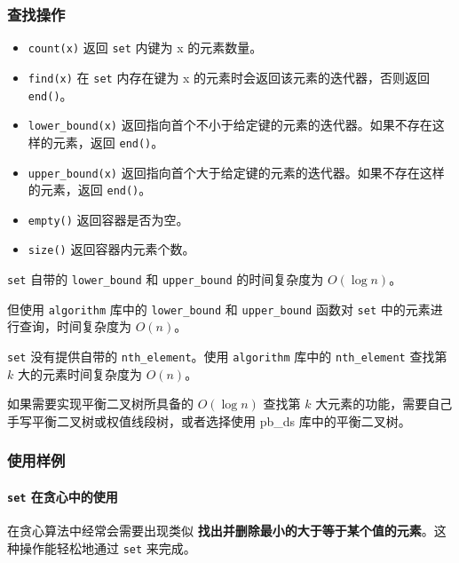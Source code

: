 \subsubsection{查找操作}\label{ux67e5ux627eux64cdux4f5c}

\begin{itemize}
\tightlist
\item
  \texttt{count(x)} 返回 \texttt{set} 内键为 x 的元素数量。
\item
  \texttt{find(x)} 在 \texttt{set} 内存在键为 x 的元素时会返回该元素的迭代器，否则返回 \texttt{end()}。
\item
  \texttt{lower\_bound(x)} 返回指向首个不小于给定键的元素的迭代器。如果不存在这样的元素，返回 \texttt{end()}。
\item
  \texttt{upper\_bound(x)} 返回指向首个大于给定键的元素的迭代器。如果不存在这样的元素，返回 \texttt{end()}。
\item
  \texttt{empty()} 返回容器是否为空。
\item
  \texttt{size()} 返回容器内元素个数。
\end{itemize}

\texttt{set} 自带的 \texttt{lower\_bound} 和 \texttt{upper\_bound} 的时间复杂度为 \(O(\log n)\)。

但使用 \texttt{algorithm} 库中的 \texttt{lower\_bound} 和 \texttt{upper\_bound} 函数对 \texttt{set} 中的元素进行查询，时间复杂度为 \(O(n)\)。

\texttt{set} 没有提供自带的 \texttt{nth\_element}。使用 \texttt{algorithm} 库中的 \texttt{nth\_element} 查找第 \(k\) 大的元素时间复杂度为 \(O(n)\)。

如果需要实现平衡二叉树所具备的 \(O(\log n)\) 查找第 \(k\) 大元素的功能，需要自己手写平衡二叉树或权值线段树，或者选择使用 pb\_ds 库中的平衡二叉树。

\subsubsection{使用样例}\label{ux4f7fux7528ux6837ux4f8b}

\paragraph{\texorpdfstring{\texttt{set} 在贪心中的使用}{set 在贪心中的使用}}\label{set-ux5728ux8d2aux5fc3ux4e2dux7684ux4f7fux7528}

在贪心算法中经常会需要出现类似 \textbf{找出并删除最小的大于等于某个值的元素}。这种操作能轻松地通过 \texttt{set} 来完成。


